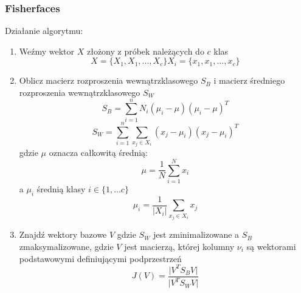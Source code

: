 \subsubsection{Fisherfaces} \label{fisher}


Działanie algorytmu:
\begin{enumerate}
\item Weźmy wektor $X$ złożony z próbek należących do $c$ klas
\begin{equation}
X=\{X_{1},X_{1},...,X_{c}\}
X_{i}=\{x_{1},x_{1},...,x_{c}\}
\end{equation}
\item Oblicz macierz rozproszenia wewnątrzklasowego $S_{B}$ i macierz średniego rozproszenia wewnątrzklasowego $S_{W}$
\begin{equation}
S_{B}=\sum_{i=1}^{n}N_{i}(\mu_{i}-\mu)(\mu_{i}-\mu)^{T}
\end{equation}
\begin{equation}
S_{W}=\sum_{i=1}^{n}\sum_{x_{j}\in X_{i}}(x_{j}-\mu_{i})(x_{j}-\mu_{i})^{T}
\end{equation}
gdzie $\mu$ oznacza całkowitą średnią:
\begin{equation}
\mu=\frac{1}{N}\sum_{i=1}^{N}x_{i}
\end{equation}
a $\mu_{i}$ średnią klasy $i\in \{1,...c\}$
\begin{equation}
\mu_{i}=\frac{1}{|X_{i}|}\sum_{x_{j}\in X_{i}}x_{j}
\end{equation}
\item Znajdź wektory bazowe $V$ gdzie $S_{W}$ jest zminimalizowane a $S_{B}$ zmaksymalizowane, gdzie $V$ jest macierzą, której kolumny $\nu_{i}$ są wektorami podstawowymi definiującymi podprzestrzeń
\begin{equation}
J(V)=\frac{\vert V^{T}S_{B}V\vert }{\vert V^{T}S_{W}V\vert }
\end{equation}
\end{enumerate}



